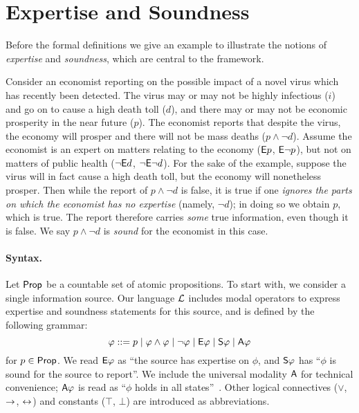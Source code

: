 \section{Expertise and Soundness}
\label{exp_sec_expertise_and_soundness}

Before the formal definitions we give an example to illustrate the notions of
\emph{expertise} and \emph{soundness}, which are central to the framework.

\begin{example}
    \label{exp_ex_economist_motivation}

    Consider an economist reporting on the possible impact of a novel virus
    which has recently been detected. The virus may or may not be highly
    infectious ($i$) and go on to cause a high death toll ($d$), and there may
    or may not be economic prosperity in the near future ($p$). The economist
    reports that despite the virus, the economy will prosper and there will not
    be mass deaths ($p \land \neg d$). Assume the economist is an expert on
    matters relating to the economy ($\E p$, $\E\neg p$), but not on matters of
    public health ($\neg\E d$, $\neg\E\neg d$). For the sake of the example,
    suppose the virus will in fact cause a high death toll, but the economy
    will nonetheless prosper. Then while the report of $p \land \neg d$ is
    false, it is true if one \emph{ignores the parts on which the economist has
    no expertise} (namely, $\neg d$); in doing so we obtain $p$, which is true.
    The report therefore carries \emph{some} true information, even though it
    is false. We say $p \land \neg d$ is \emph{sound} for the economist in this
    case.

\end{example}

\paragraph{Syntax.}

Let $\Prop$ be a countable set of atomic propositions.
%
To start with, we consider a single information source. Our language $\cL$
includes modal operators to express expertise and soundness statements for this
source, and is defined by the following grammar:
\[
\phi ::=
 p \mid
 \phi \land \phi \mid
 \neg\phi \mid
 \E\phi \mid
 \S\phi \mid
 \A\phi
\]
for $p \in \Prop$. We read $\E\phi$ as ``the source has expertise on
$\phi$, and $\S\phi$ has ``$\phi$ is sound for the source to
report''. We include the universal modality $\A$
for technical convenience; $\A\phi$ is read as ``$\phi$ holds in all
states''~\cite{goranko_1992}.  Other logical connectives ($\lor$, $\limplies$,
$\liff$) and constants ($\top$, $\bot$) are introduced as
abbreviations.

